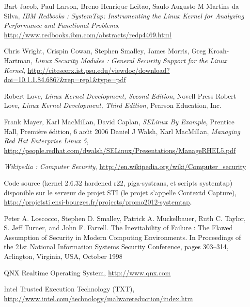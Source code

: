 \documentclass[pdftex,a4paper,titlepage,11pt]{article}
\begin{document}
\begin{thebibliography}{40}

 Bart Jacob, Paul Larson, Breno Henrique Leitao, Saulo Augusto M Martins da Silva, \textit{IBM Redbooks : SystemTap: Instrumenting the Linux Kernel for Analyzing Performance and Functional Problems}, \url{http://www.redbooks.ibm.com/abstracts/redp4469.html}

 Chris Wright, Crispin Cowan, Stephen Smalley, James Morris, Greg Kroah-Hartman, \textit{Linux Security Modules : General Security Support for the Linux Kernel}, \url{http://citeseerx.ist.psu.edu/viewdoc/download?doi=10.1.1.84.6867&rep=rep1&type=pdf}

 Robert Love, \textit{Linux Kernel Development, Second Edition}, Novell Press
 Robert Love, \textit{Linux Kernel Development, Third Edition}, Pearson Education, Inc.

 Frank Mayer, Karl MacMillan, David Caplan, \textit{SELinux By Example}, Prentice Hall, Première édition, 6 août 2006
 Daniel J Walsh, Karl MacMillan, \textit{Managing Red Hat Enterprise Linux 5}, \url{http://people.redhat.com/dwalsh/SELinux/Presentations/ManageRHEL5.pdf}

 \textit{Wikipedia : Computer Security}, \url{http://en.wikipedia.org/wiki/Computer_security}

 Code source (kernel 2.6.32 hardened r22, piga-systrans, et scripts systemtap) disponible sur le serveur de projet STI (le projet s'appelle Contextd Capture), \url{http://projetsti.ensi-bourges.fr/projects/promo2012-systemtap}.

 Peter A. Loscocco, Stephen D. Smalley, Patrick A. Muckelbauer, Ruth C. Taylor, S. Jeff Turner, and John F. Farrell. The Inevitability of Failure : The Flawed Assumption of Security in Modern Computing Environments. In Proceedings of the 21st National Information Systems Security Conference, pages 303–314, Arlington, Virginia, USA, October 1998

 QNX Realtime Operating System, \url{http://www.qnx.com}

 Intel Trusted Execution Technology (TXT), \url{http://www.intel.com/technology/malwarereduction/index.htm}

\end{thebibliography}

\end{document}
